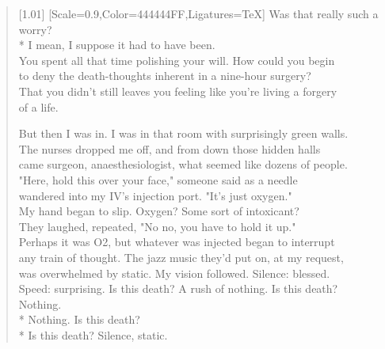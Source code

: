 \begin{verse}[1.01\textwidth]
  {[Scale=0.9,Color=444444FF,Ligatures=TeX]
  \vin Was that really such a worry?\\*
   I mean, I suppose it had to have been.\\
  \vin You spent all that time polishing your will. How could you begin\\
  \vin to deny the death-thoughts inherent in a nine-hour surgery?\\
  \vin That you didn't still leaves you feeling like you're living a forgery\\
  \vin of a life.}

  But then I was in. I was in that room with surprisingly green walls.\\
  The nurses dropped me off, and from down those hidden halls\\
  came surgeon, anaesthesiologist, what seemed like dozens of people.\\
  "Here, hold this over your face," someone said as a needle\\
  wandered into my IV's injection port. "It's just oxygen."\\
  My hand began to slip. Oxygen? Some sort of intoxicant?\\
  They laughed, repeated, "No no, you have to hold it up."\\
  Perhaps it was O2, but whatever was injected began to interrupt\\
  any train of thought. The jazz music they'd put on, at my request,\\
  was overwhelmed by static. My vision followed. Silence: blessed.\\
  Speed: surprising. Is this death? A rush of nothing. Is this death?\\
  Nothing.\\*
   Nothing. Is this death?\\*
   Is this death?
  Silence, static.


\end{verse}
